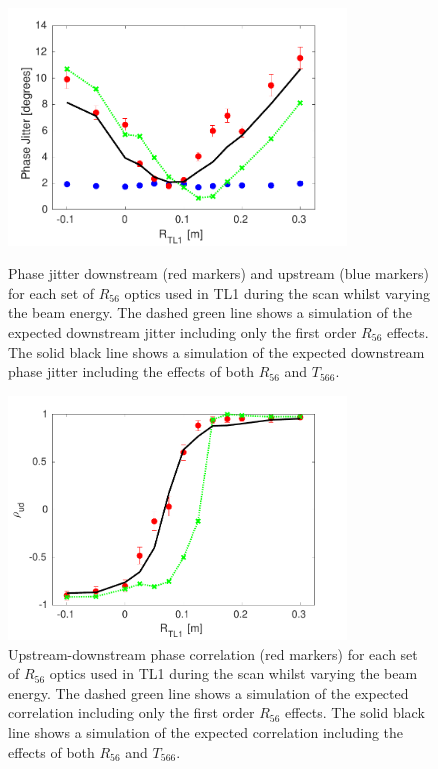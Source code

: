 \begin{figure}
  \centering
  \includegraphics[width=0.8\textwidth]{Figures/propagation/R56ScanGunWiggle_PhaseJitter}
  \caption{Phase jitter downstream (red markers) and upstream (blue markers) for each set of \(R_{56}\) optics used in TL1 during the scan whilst varying the beam energy. The dashed green line shows a simulation of the expected downstream jitter including only the first order \(R_{56}\) effects. The solid black line shows a simulation of the expected downstream phase jitter including the effects of both \(R_{56}\) and \(T_{566}\).}
  \label{f:R56ScanGunWiggle_PhaseJitter}
  \includegraphics[width=0.8\textwidth]{Figures/propagation/R56ScanGunWiggle_Correl}
  \caption{Upstream-downstream phase correlation (red markers) for each set of \(R_{56}\) optics used in TL1 during the scan whilst varying the beam energy. The dashed green line shows a simulation of the expected correlation including only the first order \(R_{56}\) effects. The solid black line shows a simulation of the expected correlation including the effects of both \(R_{56}\) and \(T_{566}\).}
  \label{f:R56ScanGunWiggle_Correl}
\end{figure}

